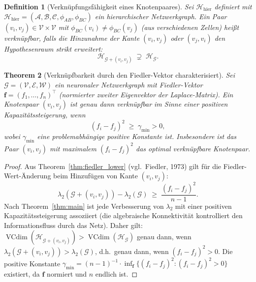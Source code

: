 ﻿\documentclass[12pt, a4paper, openany]{report}
\newtheorem{theorem}{Theorem}[chapter]
\newtheorem{definition}[theorem]{Definition}
\newcommand{\calG}{\mathcal{G}}
\newcommand{\calH}{\mathcal{H}}
\newcommand{\calV}{\mathcal{V}}
\newcommand{\calE}{\mathcal{E}}
\newcommand{\calW}{\mathcal{W}}
\newcommand{\calA}{\mathcal{A}}
\newcommand{\calB}{\mathcal{B}}
\newcommand{\calC}{\mathcal{C}}
\DeclareMathOperator{\VC}{VCdim}
\begin{document}
\begin{definition}[Verknüpfungsfähigkeit eines Knotenpaares]
\label{def:linkability}
Sei $\calH_{\mathrm{hier}}$ definiert mit $\calH_{\mathrm{hier}} = (\calA, \calB, \calC, \phi_{AB}, \phi_{BC})$
ein hierarchischer Netzwerkgraph.  Ein Paar $(v_i, v_j) \in \calV \times \calV$
mit $\phi_{BC}(v_i) \neq \phi_{BC}(v_j)$ (aus verschiedenen Zellen) heißt
\emph{verknüpfbar}, falls die Hinzunahme der Kante $(v_i, v_j)$ oder
$(v_j, v_i)$ den Hypothesenraum strikt erweitert:
\[
  \calH_{\calG + (v_i, v_j)} \;\supsetneq\; \calH_{\calG}.
\]
\end{definition}

\begin{theorem}[Verknüpfbarkeit durch den Fiedler-Vektor charakterisiert]
\label{thm:linkability_fiedler}
Sei $\calG = (\calV, \calE, \calW)$ ein neuronaler Netzwerkgraph mit
Fiedler-Vektor $\bm{f} = (f_1, \ldots, f_n)^\top$ (normierter zweiter
Eigenvektor der Laplace-Matrix).  Ein Knotenpaar $(v_i, v_j)$ ist genau
dann verknüpfbar im Sinne einer positiven Kapazitätssteigerung, wenn
\begin{equation}
  \label{eq:linkability_fiedler}
  (f_i - f_j)^2 \;\geq\; \gamma_{\min} > 0,
\end{equation}
wobei $\gamma_{\min}$ eine problemabhängige positive Konstante ist.
Insbesondere ist das Paar $(v_i, v_j)$ mit maximalem $(f_i - f_j)^2$
das optimal verknüpfbare Knotenpaar.
\end{theorem}

\begin{proof}
Aus Theorem~\ref{thm:fiedler_lower} (vgl.\ Fiedler, 1973) gilt für die
Fiedler-Wert-Änderung beim Hinzufügen von Kante $(v_i, v_j)$:
\[
  \lambda_2(\calG + (v_i, v_j)) - \lambda_2(\calG)
  \;\geq\;
  \frac{(f_i - f_j)^2}{n - 1}.
\]
Nach Theorem~\ref{thm:main} ist jede Verbesserung von $\lambda_2$ mit einer
positiven Kapazitätssteigerung assoziiert (die algebraische Konnektivität
kontrolliert den Informationsfluss durch das Netz).  Daher gilt:
$\VC(\calH_{\calG + (v_i, v_j)}) > \VC(\calH_{\calG})$ genau dann, wenn
$\lambda_2(\calG + (v_i, v_j)) > \lambda_2(\calG)$, d.h.\ genau dann, wenn
$(f_i - f_j)^2 > 0$.  Die positive Konstante $\gamma_{\min} = (n-1)^{-1}
\cdot \inf_{\bm{f}} \{(f_i - f_j)^2 : (f_i - f_j)^2 > 0\}$ existiert, da
$\bm{f}$ normiert und $n$ endlich ist.
\end{proof}
\end{document}

